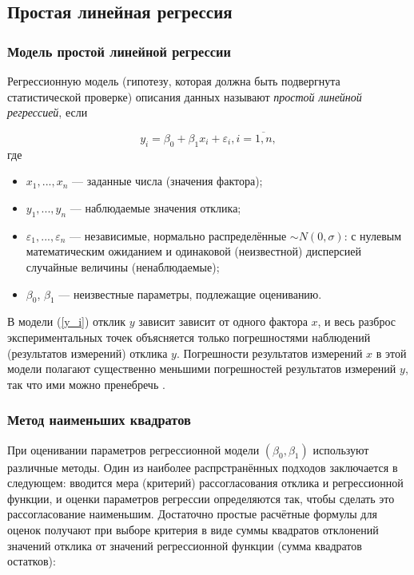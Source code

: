 \documentclass[../body.tex]{subfiles}
\begin{document}
	\subsection{Простая линейная регрессия}
	\subsubsection{Модель простой линейной регрессии}
	Регрессионную модель (гипотезу, которая должна быть подвергнута статистической проверке) описания данных называют \textit{простой линейной регрессией}, если
	
	\begin{equation}
		y_{i} = \beta_{0} + \beta_{1}x_{i} + \varepsilon_{i},  i = \overline{1, n},
		\label{y_i}
	\end{equation}
	где \begin{itemize}
			\item$x_{1},...,x_{n}$ — заданные числа (значения фактора);
			\item $y_{1},...,y_{n}$ — наблюдаемые значения отклика;
			\item $\varepsilon_{1},...,\varepsilon_{n}$ — независимые, нормально распределённые $\sim N(0,\sigma)$: с нулевым математическим ожиданием и одинаковой (неизвестной) дисперсией случайные величины (ненаблюдаемые);
			\item $\beta_{0}$, $\beta_{1}$ — неизвестные параметры, подлежащие оцениванию.
		\end{itemize}
	В модели (\ref{y_i}) отклик $y$ зависит зависит от одного фактора $x$, и весь разброс экспериментальных точек объясняется только погрешностями наблюдений (результатов измерений) отклика $y$. Погрешности результатов измерений $x$ в этой модели полагают существенно меньшими погрешностей результатов измерений $y$, так что ими можно пренебречь \cite[c.~507]{max}.
	
	
	
	\subsubsection{Метод наименьших квадратов}
	При оценивании параметров регрессионной модели $(\beta_{0}, \beta_{1})$ используют различные методы. Один из наиболее распрстранённых подходов заключается в следующем: вводится мера (критерий) рассогласования отклика и регрессионной функции, и оценки параметров регрессии определяются так, чтобы сделать это рассогласование наименьшим. Достаточно простые расчётные формулы для оценок получают при выборе критерия в виде суммы квадратов отклонений значений отклика от значений регрессионной функции (сумма квадратов остатков):
	
\end{document}
